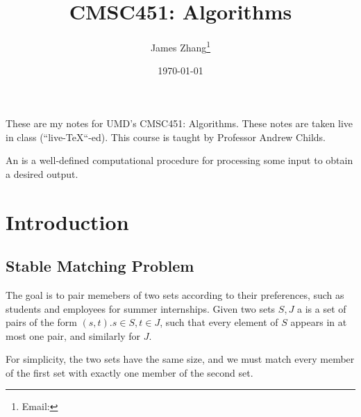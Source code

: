 \documentclass[12pt]{scrartcl}
\begin{document}
\title{CMSC451: Algorithms}
\author{James Zhang\thanks{Email: }}
\date{\today}




\maketitle
These are my notes for UMD's CMSC451: Algorithms. These notes are taken live in class 
(``live-\TeX``-ed). This course is taught by Professor Andrew Childs. 
\tableofcontents

\newpage

\begin{definition}[Algorithm]
  An  is a well-defined computational procedure for processing some input 
  to obtain a desired output.
\end{definition}

\section{Introduction}

\subsection{Stable Matching Problem}

\begin{definition}
  The goal is to pair memebers of two sets according to their preferences, such as 
  students and employees for summer internships. Given two sets $S, J$ a  
  is a set of pairs of the form $(s,t). s \in S, t \in J$, such that every element of $S$ 
  appears in at most one pair, and similarly for $J$. 
\end{definition}

\begin{note}
For simplicity, the two sets have the same size, and we must match every member of the first set 
with exactly one member of the second set. 
\end{note}
\end{document}
